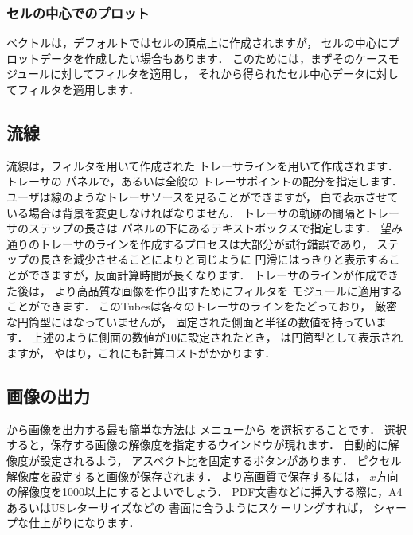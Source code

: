 \subsubsection{セルの中心でのプロット}
\label{sssec:6.1.7.1}
ベクトルは，デフォルトではセルの頂点上に作成されますが，
セルの中心にプロットデータを作成したい場合もあります．
このためには，まずそのケースモジュールに対してフィルタを適用し，
それから得られたセル中心データに対してフィルタを適用します．

\subsection{流線}
\label{ssec:6.1.8}
流線は，フィルタを用いて作成された
トレーサラインを用いて作成されます．
トレーサの
%
%
パネルで，あるいは全般の
トレーサポイントの配分を指定します．
ユーザは線のようなトレーサソースを見ることができますが，
白で表示させている場合は背景を変更しなければなりません．
トレーサの軌跡の間隔とトレーサのステップの長さは
パネルの下にあるテキストボックスで指定します．
望み通りのトレーサのラインを作成するプロセスは大部分が試行錯誤であり，
ステップの長さを減少させることによりと同じように
円滑にはっきりと表示することができますが，反面計算時間が長くなります．
トレーサのラインが作成できた後は，
より高品質な画像を作り出すためにフィルタを
モジュールに適用することができます．
このTubesは各々のトレーサのラインをたどっており，
厳密な円筒型にはなっていませんが，
固定された側面と半径の数値を持っています．
上述のように側面の数値が10に設定されたとき，
は円筒型として表示されますが，
やはり，これにも計算コストがかかります．


\subsection{画像の出力}
\label{ssec:6.1.9}
から画像を出力する最も簡単な方法は
メニューから
%
%
を選択することです．
選択すると，保存する画像の解像度を指定するウインドウが現れます．
自動的に解像度が設定されるよう，
アスペクト比を固定するボタンがあります．
ピクセル解像度を設定すると画像が保存されます．
より高画質で保存するには，
$x$方向の解像度を1000以上にするとよいでしょう．
PDF文書などに挿入する際に，A4あるいはUSレターサイズなどの
書面に合うようにスケーリングすれば，
シャープな仕上がりになります．


